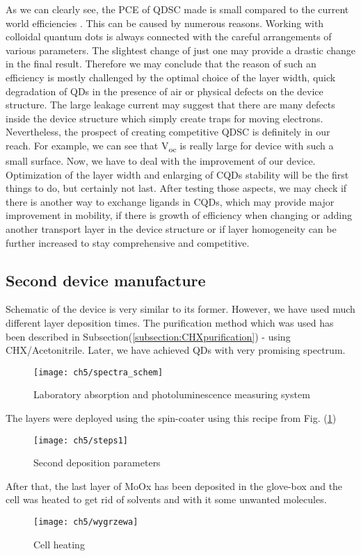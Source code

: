 As we can clearly see, the PCE of QDSC made is small compared to the
current world efficiencies \cite{Kamat2018}. This can be caused by numerous reasons.
Working with colloidal quantum dots is always connected with the careful
arrangements of various parameters. The slightest change of just one may
provide a drastic change in the final result. Therefore we may conclude
that the reason of such an efficiency is mostly challenged by the
optimal choice of the layer width, quick degradation of QDs in the
presence of air or physical defects on the device structure. The large
leakage current may suggest that there are many defects inside the
device structure which simply create traps for moving electrons.
Nevertheless, the prospect of creating competitive QDSC is definitely in
our reach. For example, we can see that V\textsubscript{oc} is really
large for device with such a small surface. Now, we have to deal with
the improvement of our device. Optimization of the layer width and
enlarging of CQDs stability will be the first things to do, but
certainly not last. After testing those aspects, we may check if there
is another way to exchange ligands in CQDs, which may provide major
improvement in mobility, if there is growth of efficiency when changing
or adding another transport layer in the device structure or if layer
homogeneity can be further increased to stay comprehensive and
competitive.

\subsection{Second device manufacture}

Schematic of the device is very similar to its former. However, we have used much different layer deposition times. The purification method which was used has been described in Subsection(\ref{subsection:CHXpurification}) - using CHX/Acetonitrile. Later, we have achieved QDs with very promising spectrum.

\begin{figure}
\centering
\texttt{[image: ch5/spectra\_schem]}
\caption{Laboratory absorption and photoluminescence measuring system }
\end{figure}

The layers were deployed using the spin-coater using this recipe from Fig. (\ref{fig:steps1})

\begin{figure}[H]
\centering
\texttt{[image: ch5/steps1]}
\caption{Second deposition parameters}
\label{fig:steps1}
\end{figure}

After that, the last layer of MoOx has been deposited in the glove-box and the cell was heated to get rid of solvents and with it some unwanted molecules. 

\begin{figure}
\centering
\texttt{[image: ch5/wygrzewa]}
\caption{Cell heating}
\end{figure}

